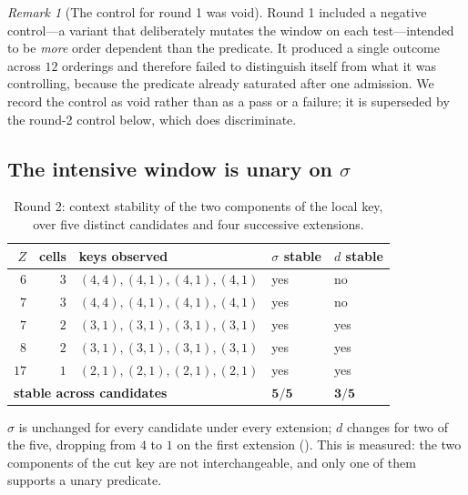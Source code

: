 \documentclass[11pt,twocolumn,a4paper]{article}
\theoremstyle{upthm}
\theoremstyle{definition}
\theoremstyle{remark}
\newtheorem{remark}[theorem]{Remark}
\newcommand{\sep}{\sigma}
\newcommand{\dep}{d}
\begin{document}
\begin{remark}[The control for round 1 was void]
\label{rem:void-control}
Round 1 included a negative control---a variant that deliberately mutates
the window on each test---intended to be \emph{more} order dependent than
the predicate. It produced a single outcome across $12$ orderings and
therefore failed to distinguish itself from what it was controlling,
because the predicate already saturated after one admission. We record
the control as void rather than as a pass or a failure; it is superseded
by the round-2 control below, which does discriminate.
\end{remark}

\subsection{The intensive window is unary on \texorpdfstring{$\sep$}{sigma}}

\begin{table}[htbp]
\centering\small
\caption{Round 2: context stability of the two components of the local
key, over five distinct candidates and four successive extensions.}
\label{tab:components}
\begin{tabular}{@{}rrlll@{}}
\toprule
$Z$ & cells & keys observed & $\sep$ stable & $\dep$ stable\\
\midrule
$6$  & $3$ & $(4,4),(4,1),(4,1),(4,1)$ & yes & no\\
$7$  & $3$ & $(4,4),(4,1),(4,1),(4,1)$ & yes & no\\
$7$  & $2$ & $(3,1),(3,1),(3,1),(3,1)$ & yes & yes\\
$8$  & $2$ & $(3,1),(3,1),(3,1),(3,1)$ & yes & yes\\
$17$ & $1$ & $(2,1),(2,1),(2,1),(2,1)$ & yes & yes\\
\midrule
\multicolumn{3}{l}{\textbf{stable across candidates}} &
$\mathbf{5/5}$ & $\mathbf{3/5}$\\
\bottomrule
\end{tabular}
\end{table}

$\sep$ is unchanged for every candidate under every extension;
$\dep$ changes for two of the five, dropping from $4$ to $1$ on the first
extension (). This is
 measured: the two components of the cut key
are not interchangeable, and only one of them supports a unary predicate.
\end{document}
